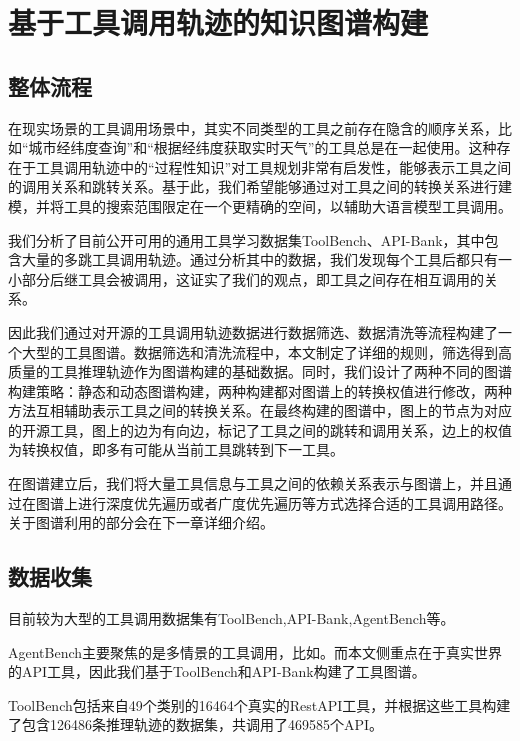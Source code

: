 
\chapter{基于工具调用轨迹的知识图谱构建}

\section{整体流程}

在现实场景的工具调用场景中，其实不同类型的工具之前存在隐含的顺序关系，比如“城市经纬度查询”和“根据经纬度获取实时天气”的工具总是在一起使用。这种存在于工具调用轨迹中的“过程性知识”对工具规划非常有启发性，能够表示工具之间的调用关系和跳转关系。基于此，我们希望能够通过对工具之间的转换关系进行建模，并将工具的搜索范围限定在一个更精确的空间，以辅助大语言模型工具调用。

我们分析了目前公开可用的通用工具学习数据集ToolBench、API-Bank，其中包含大量的多跳工具调用轨迹。通过分析其中的数据，我们发现每个工具后都只有一小部分后继工具会被调用，这证实了我们的观点，即工具之间存在相互调用的关系。

因此我们通过对开源的工具调用轨迹数据进行数据筛选、数据清洗等流程构建了一个大型的工具图谱。数据筛选和清洗流程中，本文制定了详细的规则，筛选得到高质量的工具推理轨迹作为图谱构建的基础数据。同时，我们设计了两种不同的图谱构建策略：静态和动态图谱构建，两种构建都对图谱上的转换权值进行修改，两种方法互相辅助表示工具之间的转换关系。在最终构建的图谱中，图上的节点为对应的开源工具，图上的边为有向边，标记了工具之间的跳转和调用关系，边上的权值为转换权值，即多有可能从当前工具跳转到下一工具。

在图谱建立后，我们将大量工具信息与工具之间的依赖关系表示与图谱上，并且通过在图谱上进行深度优先遍历或者广度优先遍历等方式选择合适的工具调用路径。关于图谱利用的部分会在下一章详细介绍。

\section{数据收集}

目前较为大型的工具调用数据集有ToolBench\cite{Qin2023},API-Bank\cite{Li2023c},AgentBench\cite{Liu2023b}等。

AgentBench主要聚焦的是多情景的工具调用，比如。而本文侧重点在于真实世界的API工具，因此我们基于ToolBench和API-Bank构建了工具图谱。

ToolBench包括来自49个类别的16464个真实的RestAPI工具，并根据这些工具构建了包含126486条推理轨迹的数据集，共调用了469585个API。

